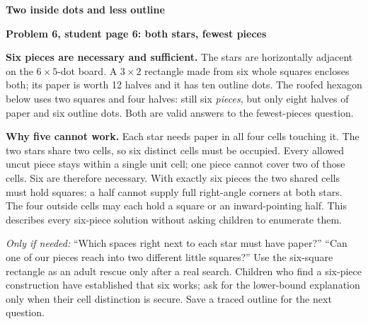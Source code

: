 \documentclass[11pt]{article}
\newcommand{\head}[1]{\par\textbf{\large #1}\par}
\newcommand{\sub}[1]{\par\textbf{#1}\par}
\newcommand{\hint}[1]{\textit{Only if needed:} #1}
\begin{document}
\newpage
\head{Two inside dots and less outline}
\sub{Problem 6, student page 6: both stars, fewest pieces}
\textbf{Six pieces are necessary and sufficient.} The stars are horizontally adjacent on the $6\times5$-dot board. A $3\times2$ rectangle made from six whole squares encloses both; its paper is worth 12 halves and it has ten outline dots. The roofed hexagon below uses two squares and four halves: still six \emph{pieces}, but only eight halves of paper and six outline dots. Both are valid answers to the fewest-pieces question.

\textbf{Why five cannot work.} Each star needs paper in all four cells touching it. The two stars share two cells, so six distinct cells must be occupied. Every allowed uncut piece stays within a single unit cell; one piece cannot cover two of those cells. Six are therefore necessary. With exactly six pieces the two shared cells must hold squares: a half cannot supply full right-angle corners at both stars. The four outside cells may each hold a square or an inward-pointing half. This describes every six-piece solution without asking children to enumerate them.

\hint{``Which spaces right next to each star must have paper?'' ``Can one of our pieces reach into two different little squares?''} Use the six-square rectangle as an adult rescue only after a real search. Children who find a six-piece construction have established that six works; ask for the lower-bound explanation only when their cell distinction is secure. Save a traced outline for the next question.
\end{document}
